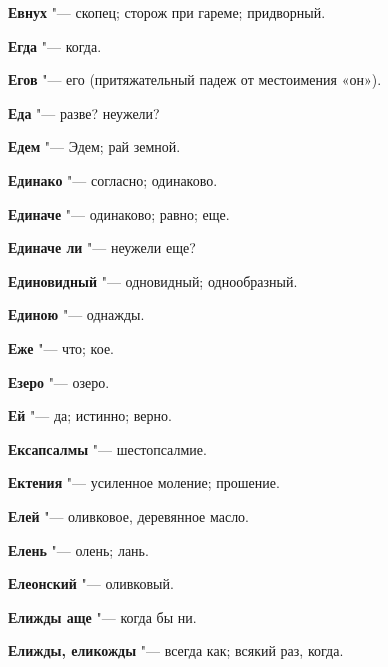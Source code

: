 \begin{mymulticols}{2}
\noindent\textbf{Евнух} "--- скопец; сторож при гареме; придворный. 




\noindent\textbf{Егда} "--- когда. 




\noindent\textbf{Егов} "--- его (притяжательный падеж от местоимения «он»). 




\noindent\textbf{Еда} "--- разве? неужели? 




\noindent\textbf{Едем} "--- Эдем; рай земной. 




\noindent\textbf{Единако} "--- согласно; одинаково. 




\noindent\textbf{Единаче} "--- одинаково; равно; еще. 




\noindent\textbf{Единаче ли} "--- неужели еще? 




\noindent\textbf{Единовидный} "--- одновидный; однообразный. 




\noindent\textbf{Единою} "--- однажды. 




\noindent\textbf{Еже} "--- что; кое. 




\noindent\textbf{Езеро} "--- озеро. 




\noindent\textbf{Ей} "--- да; истинно; верно. 




\noindent\textbf{Ексапсалмы} "--- шестопсалмие. 




\noindent\textbf{Ектения} "--- усиленное моление; прошение. 




\noindent\textbf{Елей} "--- оливковое, деревянное масло. 




\noindent\textbf{Елень} "--- олень; лань. 




\noindent\textbf{Елеонский} "--- оливковый. 




\noindent\textbf{Елижды аще} "--- когда бы ни. 




\noindent\textbf{Елижды, еликожды} "--- всегда как; всякий раз, когда. 





\end{mymulticols}
